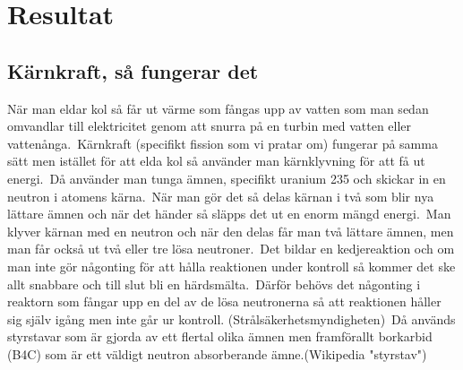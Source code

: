 \documentclass[11p]{article}
\begin{document}
    \section{Resultat}
    \subsection{Kärnkraft, så fungerar det}
    När man eldar kol så får ut värme som fångas upp av vatten som man sedan omvandlar till
    elektricitet genom att snurra på en turbin med vatten eller vattenånga.\ Kärnkraft (specifikt fission som vi pratar om)
    fungerar på samma sätt men istället för att elda kol så använder man kärnklyvning för att få ut energi.\
    Då använder man tunga ämnen, specifikt uranium 235 och skickar in en neutron i atomens kärna.\
    När man gör det så delas kärnan i två som blir nya lättare ämnen och när det händer så släpps det ut en enorm mängd energi.\
    Man klyver kärnan med en neutron och när den delas får man två lättare ämnen, men man får också ut två eller tre lösa neutroner.\
    Det bildar en kedjereaktion och om man inte gör någonting för att hålla reaktionen under kontroll så kommer
    det ske allt snabbare och till slut bli en härdsmälta.\
    Därför behövs det någonting i reaktorn som fångar upp en del av de lösa neutronerna
    så att reaktionen håller sig själv igång men inte går ur kontroll. (Strålsäkerhetsmyndigheten)\
    Då används styrstavar som är gjorda av ett flertal olika ämnen men framförallt borkarbid (B4C)
    som är ett väldigt neutron absorberande ämne.(Wikipedia "styrstav")\
\newpage
\end{document}
